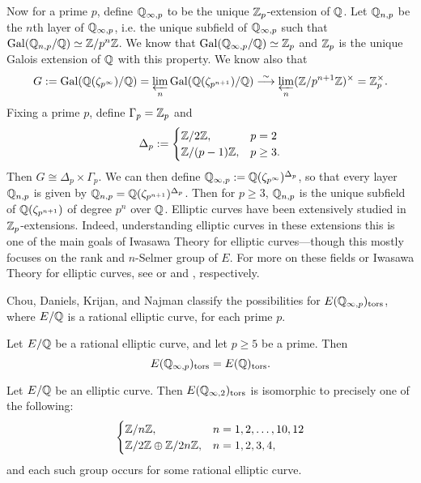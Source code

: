 Now for a prime $p$, define $\mathbb{Q}_{\infty,p}$ to be the unique $\mathbb{Z}_p$-extension of $\mathbb{Q}$. Let $\mathbb{Q}_{n,p}$ be the $n$th layer of $\mathbb{Q}_{\infty,p}$, i.e. the unique subfield of $\mathbb{Q}_{\infty,p}$ such that $\operatorname{Gal}(\mathbb{Q}_{n,p}/\mathbb{Q}) \simeq \mathbb{Z}/p^n \mathbb{Z}$. We know that $\operatorname{Gal}(\mathbb{Q}_{\infty,p}/\mathbb{Q}) \simeq \mathbb{Z}_p$ and $\mathbb{Z}_p$ is the unique Galois extension of $\mathbb{Q}$ with this property. We know also that
	\[
	G:= \operatorname{Gal}(\mathbb{Q}(\zeta_{p^\infty})/\mathbb{Q}) = \varprojlim_n \operatorname{Gal}(\mathbb{Q}(\zeta_{p^{n+1}})/\mathbb{Q}) \stackrel{\sim}{\longrightarrow} \varprojlim_n(\mathbb{Z}/p^{n+1}\mathbb{Z})^\times= \mathbb{Z}_p^\times. 
	\]
Fixing a prime $p$, define $\Gamma_p= \mathbb{Z}_p$ and
	\[
	\Delta_p:=
	\begin{cases}
	\mathbb{Z}/2\mathbb{Z}, & p= 2 \\
	\mathbb{Z}/(p - 1)\mathbb{Z}, & p \geq 3.
	\end{cases}
	\]
Then $G \cong \Delta_p \times \Gamma_p$. We can then define $\mathbb{Q}_{\infty,p}:= \mathbb{Q}(\zeta_{p^\infty})^{\Delta_p}$, so that every layer $\mathbb{Q}_{n,p}$ is given by $\mathbb{Q}_{n,p}= \mathbb{Q}(\zeta_{p^{n+1}})^{\Delta_p}$. Then for $p \geq 3$, $\mathbb{Q}_{n,p}$ is the unique subfield of $\mathbb{Q}(\zeta_{p^{n+1}})$ of degree $p^n$ over $\mathbb{Q}$. Elliptic curves have been extensively studied in $\mathbb{Z}_p$-extensions. Indeed, understanding elliptic curves in these extensions this is one of the main goals of Iwasawa Theory for elliptic curves---though this mostly focuses on the rank and $n$-Selmer group of $E$. For more on these fields or Iwasawa Theory for elliptic curves, see \cite{washington97} or \cite{lang90} and \cite{greenberg99}, respectively. 


Chou, Daniels, Krijan, and Najman classify the possibilities for $E(\mathbb{Q}_{\infty,p})_{\text{tors}}$, where $E/\mathbb{Q}$ is a rational elliptic curve, for each prime $p$. 


\begin{thm}
Let $E/\mathbb{Q}$ be a rational elliptic curve, and let $p \geq 5$ be a prime. Then
	\[
	E(\mathbb{Q}_{\infty,p})_{\text{tors}}= E(\mathbb{Q})_{\text{tors}}.
	\]
\end{thm}


\begin{thm}
Let $E/\mathbb{Q}$ be an elliptic curve. Then $E(\mathbb{Q}_{\infty,2})_{\text{tors}}$ is isomorphic to precisely one of the following:
	\[
	\begin{cases}
	\mathbb{Z}/n\mathbb{Z},& n= 1, 2, \ldots, 10, 12 \\ 
	\mathbb{Z}/2\mathbb{Z} \oplus \mathbb{Z}/2n\mathbb{Z},&  n= 1, 2, 3, 4, 
	\end{cases}
	\]
and each such group occurs for some rational elliptic curve. 
\end{thm}



